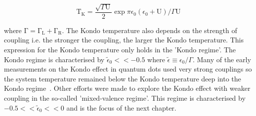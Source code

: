 \begin{equation}\label{eq:kondo_temp}
  \mathrm{T_K} = 
  \frac{\sqrt{\Gamma \mathrm{U}}}{2}
  \exp{\pi \epsilon_0 (\epsilon_0 + \mathrm{U})/\Gamma\mathrm{U}}
\end{equation}

where $\mathrm{\Gamma = \Gamma_L + \Gamma_R}$. The Kondo temperature also depends on the strength of coupling i.e. the stronger the coupling, the larger the Kondo temperature. This expression for the Kondo temperature only holds in the 'Kondo regime'. The Kondo regime is characterised by $\tilde{\epsilon}_0<<-0.5$ where $\tilde{\epsilon}\equiv \epsilon_0/\Gamma$. Many of the early measurements on the Kondo effect in quantum dots used very strong couplings so the system temperature remained below the Kondo temperature deep into the Kondo regime~\cite{kondo_unitary}. Other efforts were made to explore the Kondo effect with weaker coupling in the so-called 'mixed-valence regime'. This regime is characterised by $-0.5<<\tilde{\epsilon}_0<<0$ and is the focus of the next chapter. 



